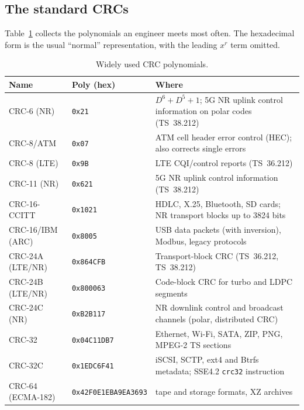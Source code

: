 \subsection{The standard CRCs}

Table~\ref{tab:ch14:crc} collects the polynomials an engineer meets most often. The hexadecimal
form is the usual ``normal'' representation, with the leading $x^r$ term omitted.

\begin{table}[htbp]\centering\small
\caption{Widely used CRC polynomials.}
\label{tab:ch14:crc}
\begin{tabularx}{\linewidth}{@{}l l X@{}}
\toprule
Name & Poly (hex) & Where\\
\midrule
CRC-6 (NR) & \texttt{0x21} & $D^6+D^5+1$; 5G NR uplink control information on polar codes (TS~38.212)\\
CRC-8/ATM & \texttt{0x07} & ATM cell header error control (HEC); also corrects single errors\\
CRC-8 (LTE) & \texttt{0x9B} & LTE CQI/control reports (TS~36.212)\\
CRC-11 (NR) & \texttt{0x621} & 5G NR uplink control information (TS~38.212)\\
CRC-16-CCITT & \texttt{0x1021} & HDLC, X.25, Bluetooth, SD cards; NR transport blocks up to 3824 bits\\
CRC-16/IBM (ARC) & \texttt{0x8005} & USB data packets (with inversion), Modbus, legacy protocols\\
CRC-24A (LTE/NR) & \texttt{0x864CFB} & Transport-block CRC (TS~36.212, TS~38.212)\\
CRC-24B (LTE/NR) & \texttt{0x800063} & Code-block CRC for turbo and LDPC segments\\
CRC-24C (NR) & \texttt{0xB2B117} & NR downlink control and broadcast channels (polar, distributed CRC)\\
CRC-32 & \texttt{0x04C11DB7} & Ethernet, Wi-Fi, SATA, ZIP, PNG, MPEG-2 TS sections\\
CRC-32C & \texttt{0x1EDC6F41} & iSCSI, SCTP, ext4 and Btrfs metadata; SSE4.2 \texttt{crc32} instruction\\
CRC-64 (ECMA-182) & \texttt{0x42F0E1EBA9EA3693} & tape and storage formats, XZ archives\\
\bottomrule
\end{tabularx}
\end{table}

